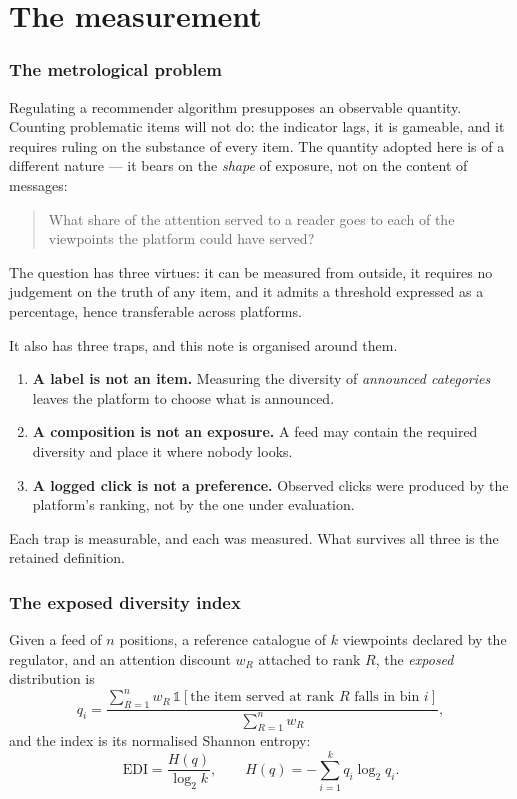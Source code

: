 \documentclass[11pt,a4paper]{article}
\begin{document}
\part{The measurement}
\label{part:measure}

\section{The metrological problem}
\label{sec:problem}

Regulating a recommender algorithm presupposes an observable quantity. Counting problematic
items will not do: the indicator lags, it is gameable, and it requires ruling on the substance
of every item. The quantity adopted here is of a different nature --- it bears on the
\emph{shape} of exposure, not on the content of messages:

\begin{quote}
What share of the attention served to a reader goes to each of the viewpoints the platform
could have served?
\end{quote}

The question has three virtues: it can be measured from outside, it requires no judgement on
the truth of any item, and it admits a threshold expressed as a percentage, hence transferable
across platforms.

It also has three traps, and this note is organised around them.

\begin{enumerate}
\item \textbf{A label is not an item.} Measuring the diversity of \emph{announced categories}
      leaves the platform to choose what is announced.
\item \textbf{A composition is not an exposure.} A feed may contain the required diversity and
      place it where nobody looks.
\item \textbf{A logged click is not a preference.} Observed clicks were produced by the
      platform's ranking, not by the one under evaluation.
\end{enumerate}

Each trap is measurable, and each was measured. What survives all three is the retained
definition.

\section{The exposed diversity index}
\label{sec:index}

Given a feed of $n$ positions, a reference catalogue of $k$ viewpoints declared by the
regulator, and an attention discount $w_R$ attached to rank $R$, the \emph{exposed}
distribution is
\begin{equation}
q_i = \frac{\sum_{R=1}^{n} w_R \, \mathbb{1}\!\left[\text{the item served at rank } R
      \text{ falls in bin } i\right]}{\sum_{R=1}^{n} w_R},
\label{eq:distribution}
\end{equation}
and the index is its normalised Shannon entropy:
\begin{equation}
\mathrm{EDI} = \frac{H(q)}{\log_2 k}, \qquad H(q) = -\sum_{i=1}^{k} q_i \log_2 q_i .
\label{eq:edi}
\end{equation}
\end{document}

